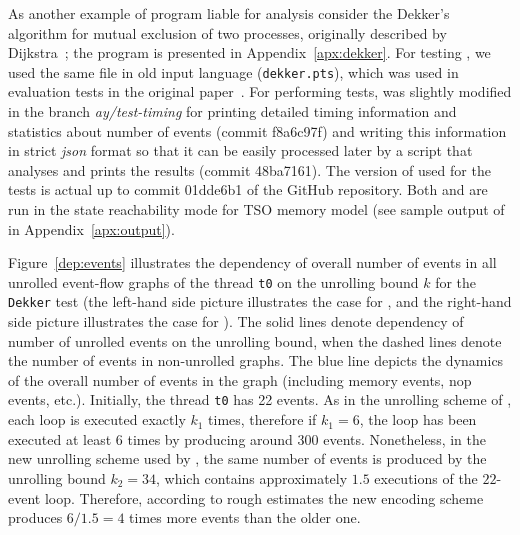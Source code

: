 As another example of program liable for analysis consider the Dekker's algorithm for mutual exclusion of two processes, originally described by Dijkstra~\cite{dijkstra1962over}; the program is presented in Appendix~\ref{apx:dekker}.
For testing \porthos[1], we used the same file in old \porthos{} input language (\texttt{dekker.pts}), which was used in evaluation tests in the original paper~\cite{Porthos17a}.
For performing tests, \porthos[2] was slightly modified in the branch \textit{ay/test-timing}%
%
for printing detailed timing information and statistics about number of events (commit f8a6c97f) and writing this information in strict \textit{json} format so that it can be easily processed later by a script that analyses and prints the results (commit 48ba7161).
The version of \porthos[2] used for the tests is actual up to commit 01dde6b1 of the \porthos[2] GitHub repository.
Both \porthos[1] and \porthos[2] are run in the state reachability mode for TSO memory model (see sample output of \porthos[2] in Appendix~\ref{apx:output}).

Figure~\ref{dep:events} illustrates the dependency of overall number of events in all unrolled event-flow graphs of the thread \texttt{t0} on the unrolling bound $k$ for the \texttt{Dekker} test (the left-hand side picture illustrates the case for \porthos[2], and the right-hand side picture illustrates the case for \porthos{}).
The solid lines denote dependency of number of unrolled events on the unrolling bound, when the dashed lines denote the number of events in non-unrolled graphs.
The blue line depicts the dynamics of the overall number of events in the graph (including memory events, nop events, etc.).
Initially, the thread \texttt{t0} has 22 events.
As in the unrolling scheme of \porthos[1], each loop is executed exactly $k_1$ times, therefore if $k_1=6$, the loop has been executed at least 6 times by producing around $300$ events.
Nonetheless, in the new unrolling scheme used by \porthos[2], the same number of events is produced by the unrolling bound $k_2=34$, which contains approximately $1.5$ executions of the $22$-event loop.
Therefore, according to rough estimates the new encoding scheme produces $6/1.5=4$ times more events than the older one.

